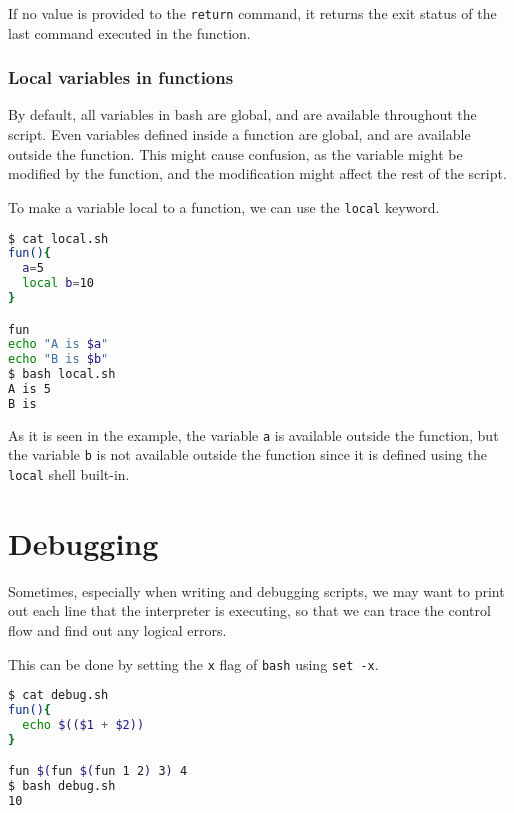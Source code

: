 \begin{remark}
  If no value is provided to the \lstinline|return| command, it returns the exit status of the last command executed in the function.
\end{remark}

\subsubsection{Local variables in functions}

By default, all variables in bash are global, and are available throughout the script.
Even variables defined inside a function are global, and are available outside the function.
This might cause confusion, as the variable might be modified by the function, and the modification might affect the rest of the script.

To make a variable local to a function, we can use the \lstinline|local| keyword.

\begin{lstlisting}[language=bash]
$ cat local.sh
fun(){
  a=5
  local b=10
}

fun
echo "A is $a"
echo "B is $b"
$ bash local.sh
A is 5
B is
\end{lstlisting}

As it is seen in the example, the variable \lstinline|a| is available outside the function, but the variable \lstinline|b| is not available outside the function since it is defined using the \lstinline|local| shell built-in.

\section{Debugging}

Sometimes, especially when writing and debugging scripts, we may want to print out each line that the interpreter is executing, so that we can trace the control flow and find out any logical errors.

This can be done by setting the \lstinline|x| flag of \lstinline|bash| using \lstinline|set -x|.

\begin{lstlisting}[language=bash]
$ cat debug.sh
fun(){
  echo $(($1 + $2))
}

fun $(fun $(fun 1 2) 3) 4
$ bash debug.sh
10
\end{lstlisting}

